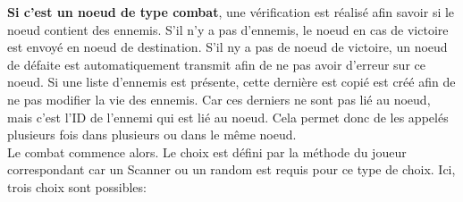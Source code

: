 			\textbf{Si c'est un noeud de type combat}, une vérification est réalisé afin savoir si le noeud contient des ennemis. S'il n'y a pas d'ennemis, le noeud en cas de victoire est envoyé en noeud de destination. S'il ny a pas de noeud de victoire, un noeud de défaite est automatiquement transmit afin de ne pas avoir d'erreur sur ce noeud. Si une liste d'ennemis est présente, cette dernière est copié est créé afin de ne pas modifier la vie des ennemis. Car ces derniers ne sont pas lié au noeud, mais c'est l'ID de l'ennemi qui est lié au noeud. Cela permet donc de les appelés plusieurs fois dans plusieurs ou dans le même noeud.\\
			Le combat commence alors. Le choix est défini par la méthode du joueur correspondant car un Scanner ou un random est requis pour ce type de choix. Ici, trois choix sont possibles:


